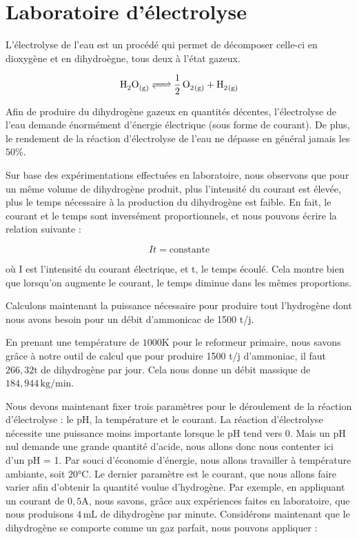 \section{Laboratoire d’électrolyse}

L'électrolyse de l'eau est un procédé qui permet de décomposer 
celle-ci en dioxygène et en dihydroègne, tous deux à l'état gazeux.

\begin{equation*}
	\ce{H2O_{(g)} <=> \frac{1}{2} \, O2_{(g)} + H2_{(g)}} 
\end{equation*}

Afin de produire du dihydrogène gazeux en quantités décentes, l'électrolyse de l'eau 
demande énormément d'énergie électrique (sous forme de courant). De plus, le rendement
de la réaction d'électrolyse de l'eau ne dépasse en général jamais les $50\%$.

Sur base des expérimentations effectuées en laboratoire, nous observons que pour un même volume de dihydrogène produit, 
plus l’intensité du courant est élevée, plus le temps nécessaire à la production
du dihydrogène est faible. En fait, le courant et le temps sont inversément proportionnels, 
et nous pouvons écrire la relation suivante :

\begin{equation*}
	It = \text{constante}
\end{equation*}

où I est l'intensité du courant électrique, et t, le temps écoulé. 
Cela montre bien que lorsqu'on augmente le courant, le temps diminue dans les mêmes proportions.

Calculons maintenant la puissance nécessaire pour produire tout l'hydrogène 
dont nous avons besoin pour un débit d'ammonicac de 1500 t/j.

En prenant une température de $1000 \si{\kelvin}$ pour le reformeur primaire, 
nous savons grâce à notre outil de calcul que pour produire 1500 t/j d'ammoniac, il faut $266,32 \si{\tonne}$ de dihydrogène 
par jour. Cela nous donne un débit massique de $184,944 \, \si{\kilo\gram/\minute}$.

Nous devons maintenant fixer trois paramètres pour le déroulement de la réaction d'électrolyse : le pH, la température et le courant.
La réaction d'électrolyse nécessite une puissance moins importante lorsque le pH tend vers 0. Mais un pH nul demande une grande quantité d'acide, nous allons donc nous contenter ici d'un pH = 1.
Par souci d'économie d'énergie, nous allons travailler à température ambiante, soit $20\si{\celsius}$.
Le dernier paramètre est le courant, que nous allons faire varier afin d'obtenir la quantité voulue d'hydrogène.
Par exemple, en appliquant un courant de $0,5 \si{\ampere}$, nous savons, grâce aux expériences faites en laboratoire, 
que nous produisons $4 \, \si{\milli\liter}$ de dihydrogène par minute. 
Considérons maintenant que le dihydrogène se comporte comme un gaz parfait, nous pouvons appliquer :

